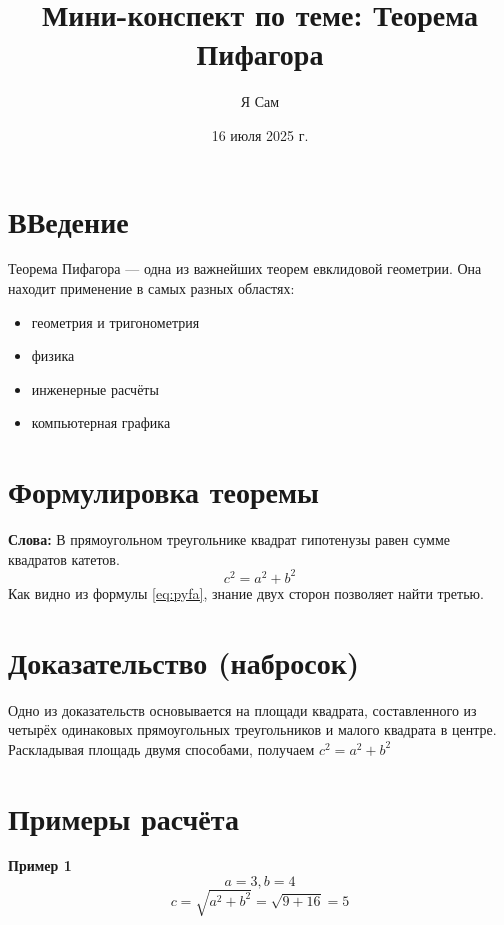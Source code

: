 \documentclass{article}
\title{Мини-конспект по теме: Теорема Пифагора}
\author{Я Сам}
\date{16 июля 2025 г.}
\begin{document}
\maketitle
\tableofcontents
\section{ВВедение}
Теорема Пифагора — одна из важнейших теорем евклидовой геометрии. Она находит применение в самых разных областях:
\begin{itemize}
    \item  геометрия и тригонометрия
    \item физика
    \item инженерные расчёты
    \item компьютерная графика
\end{itemize}
\section{Формулировка теоремы}
\textbf{Слова:} В прямоугольном треугольнике квадрат гипотенузы равен сумме квадратов катетов.
\begin{equation}
\label{eq:pyfa}
c^{2} = a^{2} + b^{2}
\end{equation}
Как видно из формулы \ref{eq:pyfa}, знание двух сторон позволяет найти третью.

\section{Доказательство (набросок)}
Одно из доказательств основывается на площади квадрата, составленного из четырёх одинаковых прямоугольных треугольников и малого квадрата в центре. Раскладывая площадь двумя способами, получаем $c^{2} = a^{2} + b^{2}$

\section{Примеры расчёта}
\textbf{Пример 1}
\[
a = 3, b = 4
\]
\[
c = \sqrt{a^{2} + b^{2}} = \sqrt{9 + 16} = 5
\]
\end{document}
